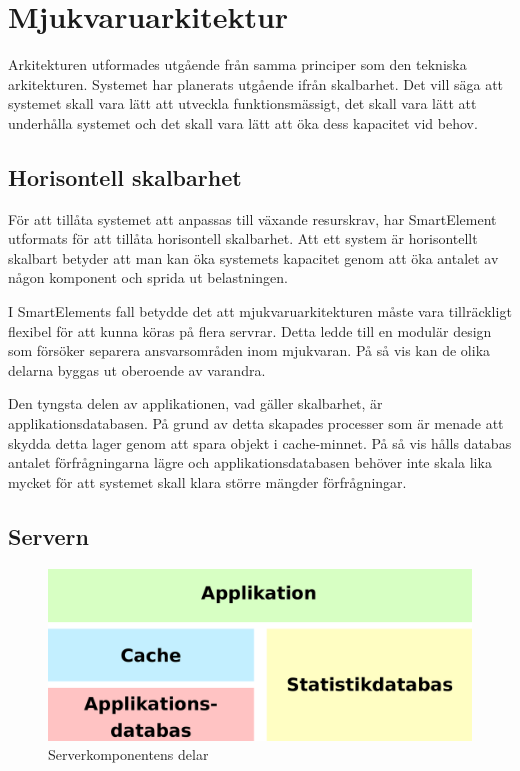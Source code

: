 \section{Mjukvaruarkitektur}

Arkitekturen utformades utgående från samma principer som den tekniska arkitekturen. Systemet har planerats utgående ifrån skalbarhet. Det vill säga att systemet skall vara lätt att utveckla funktionsmässigt, det skall vara lätt att underhålla systemet och det skall vara lätt att öka dess kapacitet vid behov. \citep[s. 203]{scalableweb}

\subsection{Horisontell skalbarhet}

För att tillåta systemet att anpassas till växande resurskrav, har SmartElement utformats för att tillåta horisontell skalbarhet. Att ett system är horisontellt skalbart betyder att man kan öka systemets kapacitet genom att öka antalet av någon komponent och sprida ut belastningen.\citep[s. 205-207]{scalableweb}

I SmartElements fall betydde det att mjukvaruarkitekturen måste vara tillräckligt flexibel för att kunna köras på flera servrar. Detta ledde till en modulär design som försöker separera ansvarsområden inom mjukvaran. På så vis kan de olika delarna byggas ut oberoende av varandra.

Den tyngsta delen av applikationen, vad gäller skalbarhet, är applikationsdatabasen. På grund av detta skapades processer som är menade att skydda detta lager genom att spara objekt i cache-minnet. På så vis hålls databas antalet förfrågningarna lägre och applikationsdatabasen behöver inte skala lika mycket för att systemet skall klara större mängder förfrågningar.

\subsection{Servern}

\begin{figure}[h!]
\centering
\includegraphics[width=120mm]{assets/images/smelementbackendparts.png}
\caption{Serverkomponentens delar}
\label{abstractbackend}
\end{figure}

